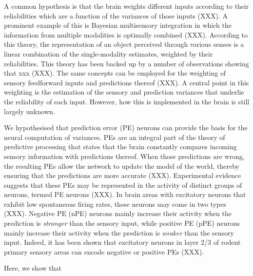 \documentclass[10pt,a4paper,draft]{article}
\begin{document}
A common hypothesis is that the brain weights different inputs according to their reliabilities which are a function of the variances of those inputs (XXX). A prominent example of this is Bayesian multisensory integration in which the information from multiple modalities is optimally combined (XXX). According to this theory, the representation of an object perceived through various senses is a linear combination of the single-modality estimates, weighted by their reliabilities. This theory has been backed up by a number of observations showing that xxx (XXX). The same concepts can be employed for the weighting of sensory feedforward inputs and predictions thereof (XXX). A central point in this weighting is the estimation of the sensory and prediction variances that underlie the reliability of each input. However, how this is implemented in the brain is still largely unknown. 

We hypothesised that prediction error (PE) neurons can provide the basis for the neural computation of variances. PEs are an integral part of the theory of predictive processing that states that the brain constantly compares incoming sensory information with predictions thereof. When those predictions are wrong, the resulting PEs allow the network to update the model of the world, thereby ensuring that the predictions are more accurate (XXX). Experimental evidence suggests that these PEs may be represented in the activity of distinct groups of neurons, termed PE neurons (XXX). In brain areas with excitatory neurons that exhibit low spontaneous firing rates, these neurons may come in two types (XXX). Negative PE (nPE) neurons mainly increase their activity when the prediction is \textit{stronger} than the sensory input, while positive PE (pPE) neurons mainly increase their activity when the prediction is \textit{weaker} than the sensory input. Indeed, it has been shown that excitatory neurons in layer 2/3 of rodent primary sensory areas can encode negative or positive PEs (XXX). 


Here, we show that 
\end{document}
